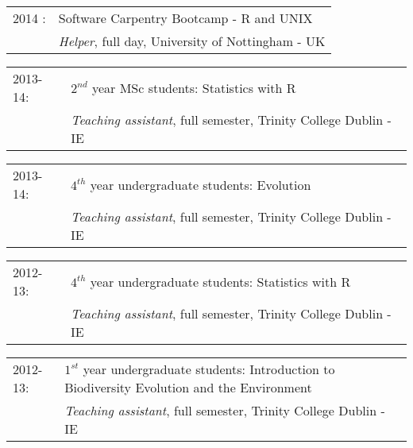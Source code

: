 \documentclass[10pt,a4paper]{article}
\begin{document}
{\begin{tabular}{ll}
2014 : & Software Carpentry Bootcamp - R and UNIX \\
      & \textit{Helper}, full day, University of Nottingham - UK \\
\end{tabular}
\begin{tabular}{ll}
2013-14: & $2^{nd}$ year MSc students: Statistics with R \\
         & \textit{Teaching assistant}, full semester, Trinity College Dublin - IE \\
\end{tabular}
\begin{tabular}{ll}
2013-14: & $4^{th}$ year undergraduate students: Evolution\\
         & \textit{Teaching assistant}, full semester, Trinity College Dublin - IE\\
\end{tabular}
\begin{tabular}{ll}
2012-13: & $4^{th}$ year undergraduate students: Statistics with R\\
         & \textit{Teaching assistant}, full semester, Trinity College Dublin - IE\\
\end{tabular}
\begin{tabular}{ll}
2012-13: & $1^{st}$ year undergraduate students: Introduction to Biodiversity Evolution and the Environment\\
         & \textit{Teaching assistant}, full semester, Trinity College Dublin - IE\\
\end{tabular}
\begin{tabular}{ll}
\end{tabular}

\bigskip

}
\end{document}
